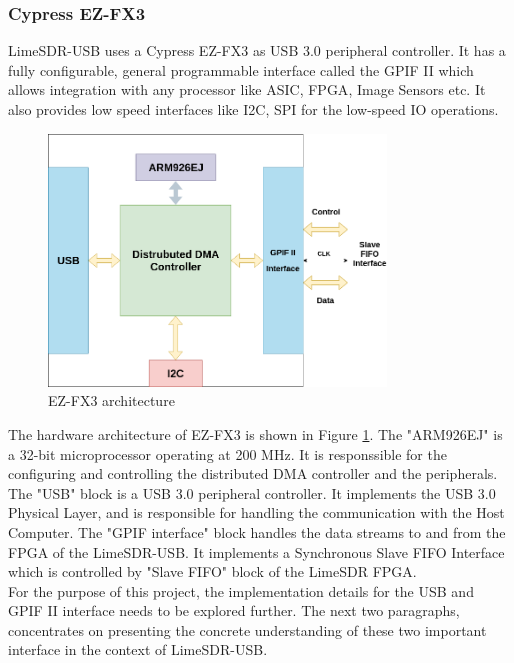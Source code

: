 \subsubsection{Cypress EZ-FX3}
LimeSDR-USB uses a Cypress EZ-FX3 as \ac{USB} 3.0 peripheral controller.
It has a fully configurable, general programmable interface called the \ac{GPIF} II which allows integration with any processor like \ac{ASIC}, \ac{FPGA}, Image Sensors etc.
It also provides low speed interfaces like \ac{I2C}, \ac{SPI} for the low-speed \ac{IO} operations.\\

\begin{figure}[h!]
\centering
\hspace*{2.5cm}\includegraphics[width=0.8\textwidth]{Figure/FX3.png}
\caption{EZ-FX3 architecture}
\label{FX3_arch}
\end{figure}
The hardware architecture of EZ-FX3 is shown in Figure \ref{FX3_arch}.
The "ARM926EJ" is a 32-bit microprocessor operating at 200 MHz.
It is responssible for the configuring and controlling the distributed \ac{DMA} controller and the peripherals.
The "USB" block is a \ac{USB} 3.0 peripheral controller.
It implements the \ac{USB} 3.0 Physical Layer, and is responsible for handling the communication with the Host Computer.
The "\ac{GPIF} interface" block handles the data streams to and from the \ac{FPGA} of the LimeSDR-USB. 
It implements a Synchronous Slave FIFO Interface which is controlled by "Slave FIFO" block of the LimeSDR \ac{FPGA}.\\

For the purpose of this project, the implementation details for the USB and GPIF II interface needs to be explored further.
The next two paragraphs, concentrates on presenting the concrete understanding of these two important interface in the context of LimeSDR-USB.


